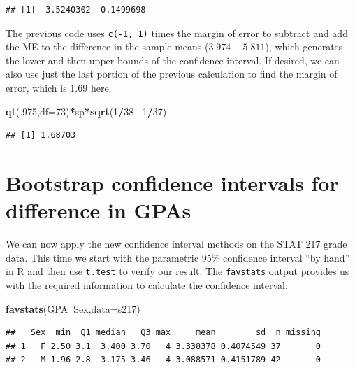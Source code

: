 \documentclass[]{book}
\newenvironment{Shaded}{\begin{snugshade}}{\end{snugshade}}
\newcommand{\KeywordTok}[1]{\textcolor[rgb]{0.13,0.29,0.53}{\textbf{#1}}}
\newcommand{\DataTypeTok}[1]{\textcolor[rgb]{0.13,0.29,0.53}{#1}}
\newcommand{\DecValTok}[1]{\textcolor[rgb]{0.00,0.00,0.81}{#1}}
\newcommand{\OperatorTok}[1]{\textcolor[rgb]{0.81,0.36,0.00}{\textbf{#1}}}
\newcommand{\NormalTok}[1]{#1}
\theoremstyle{definition}
\theoremstyle{definition}
\theoremstyle{remark}
\begin{document}
\begin{verbatim}
## [1] -3.5240302 -0.1499698
\end{verbatim}

The previous code uses \texttt{c(-1,\ 1)} times the margin of error to
subtract and add the ME to the difference in the sample means
(\(3.974-5.811\)), which generates the lower and then upper bounds of
the confidence interval. If desired, we can also use just the last
portion of the previous calculation to find the margin of error, which
is 1.69 here.

\begin{Shaded}
\begin{Highlighting}[]
\KeywordTok{qt}\NormalTok{(.}\DecValTok{975}\NormalTok{,}\DataTypeTok{df=}\DecValTok{73}\NormalTok{)}\OperatorTok{*}\NormalTok{sp}\OperatorTok{*}\KeywordTok{sqrt}\NormalTok{(}\DecValTok{1}\OperatorTok{/}\DecValTok{38}\OperatorTok{+}\DecValTok{1}\OperatorTok{/}\DecValTok{37}\NormalTok{)}
\end{Highlighting}
\end{Shaded}

\begin{verbatim}
## [1] 1.68703
\end{verbatim}

\section{Bootstrap confidence intervals for difference in
GPAs}\label{section2-9}

We can now apply the new confidence interval methods on the STAT 217
grade data. This time we start with the parametric 95\% confidence
interval ``by hand'' in R and then use \texttt{t.test} to verify our
result. The \texttt{favstats} output provides us with the required
information to calculate the confidence interval:

\begin{Shaded}
\begin{Highlighting}[]
\KeywordTok{favstats}\NormalTok{(GPA}\OperatorTok{~}\NormalTok{Sex,}\DataTypeTok{data=}\NormalTok{s217)}
\end{Highlighting}
\end{Shaded}

\begin{verbatim}
##   Sex  min  Q1 median   Q3 max     mean        sd  n missing
## 1   F 2.50 3.1  3.400 3.70   4 3.338378 0.4074549 37       0
## 2   M 1.96 2.8  3.175 3.46   4 3.088571 0.4151789 42       0
\end{verbatim}
\end{document}
